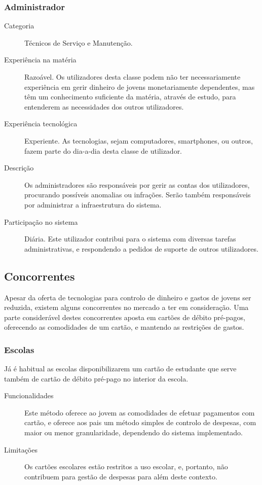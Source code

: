 \documentclass{article}
\begin{document}
    \subsubsection{Administrador}

      \begin{description}
        \item[Categoria]Técnicos de Serviço e Manutenção.
        \item[Experiência na matéria]Razoável. Os utilizadores desta classe podem não ter necessariamente experiência em gerir dinheiro de jovens monetariamente dependentes, mas têm um conhecimento suficiente da matéria, através de estudo, para entenderem as necessidades dos outros utilizadores.
        \item[Experiência tecnológica]Experiente. As tecnologias, sejam computadores, smartphones, ou outros, fazem parte do dia-a-dia desta classe de utilizador.
        \item[Descrição]Os administradores são responsáveis por gerir as contas dos utilizadores, procurando possíveis anomalias ou infrações. Serão também responsáveis por administrar a infraestrutura do sistema.
        \item[Participação no sistema]Diária. Este utilizador contribui para o sistema com diversas tarefas administrativas, e respondendo a pedidos de suporte de outros utilizadores.   
      \end{description}

  \subsection{Concorrentes}

    Apesar da oferta de tecnologias para controlo de dinheiro e gastos de jovens ser reduzida, existem alguns concorrentes no mercado a ter em consideração. Uma parte considerável destes concorrentes aposta em cartões de débito pré-pagos, oferecendo as comodidades de um cartão, e mantendo as restrições de gastos.

    \subsubsection{Escolas}

      Já é habitual as escolas disponibilizarem um cartão de estudante que serve também de cartão de débito pré-pago no interior da escola.

      \begin{description}
        \item[Funcionalidades] Este método oferece ao jovem as comodidades de efetuar pagamentos com cartão, e oferece aos pais um método simples de controlo de despesas, com maior ou menor granularidade, dependendo do sistema implementado.

        \item[Limitações] Os cartões escolares estão restritos a uso escolar, e, portanto, não contribuem para gestão de despesas para além deste contexto.
      \end{description}
\end{document}
